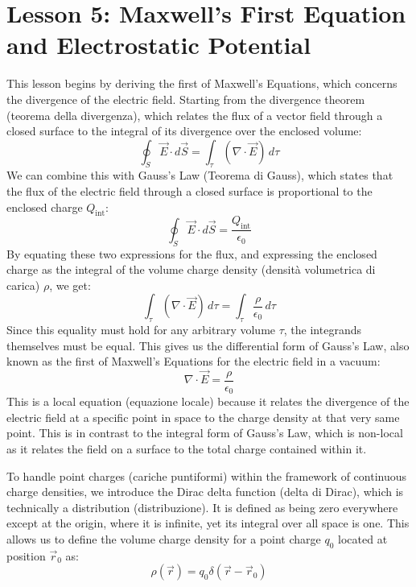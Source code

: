 \section*{Lesson 5: Maxwell's First Equation and Electrostatic Potential}

This lesson begins by deriving the first of Maxwell's Equations, which concerns the divergence of the electric field. Starting from the divergence theorem (teorema della divergenza), which relates the flux of a vector field through a closed surface to the integral of its divergence over the enclosed volume:
\begin{equation}
    \oint_S \vec{E} \cdot d\vec{S} = \int_\tau (\nabla \cdot \vec{E}) \, d\tau
\end{equation}
We can combine this with Gauss's Law (Teorema di Gauss), which states that the flux of the electric field through a closed surface is proportional to the enclosed charge \(Q_{\text{int}}\):
\begin{equation}
    \oint_S \vec{E} \cdot d\vec{S} = \frac{Q_{\text{int}}}{\epsilon_0}
\end{equation}
By equating these two expressions for the flux, and expressing the enclosed charge as the integral of the volume charge density (densità volumetrica di carica) \(\rho\), we get:
\begin{equation}
    \int_\tau (\nabla \cdot \vec{E}) \, d\tau = \int_\tau \frac{\rho}{\epsilon_0} \, d\tau
\end{equation}
Since this equality must hold for any arbitrary volume \(\tau\), the integrands themselves must be equal. This gives us the differential form of Gauss's Law, also known as the first of Maxwell's Equations for the electric field in a vacuum:
\begin{equation}
    \nabla \cdot \vec{E} = \frac{\rho}{\epsilon_0}
\end{equation}
This is a local equation (equazione locale) because it relates the divergence of the electric field at a specific point in space to the charge density at that very same point. This is in contrast to the integral form of Gauss's Law, which is non-local as it relates the field on a surface to the total charge contained within it.

To handle point charges (cariche puntiformi) within the framework of continuous charge densities, we introduce the Dirac delta function (delta di Dirac), which is technically a distribution (distribuzione). It is defined as being zero everywhere except at the origin, where it is infinite, yet its integral over all space is one. This allows us to define the volume charge density for a point charge \(q_0\) located at position \(\vec{r}_0\) as:
\begin{equation}
    \rho(\vec{r}) = q_0 \delta(\vec{r} - \vec{r}_0)
\end{equation}

